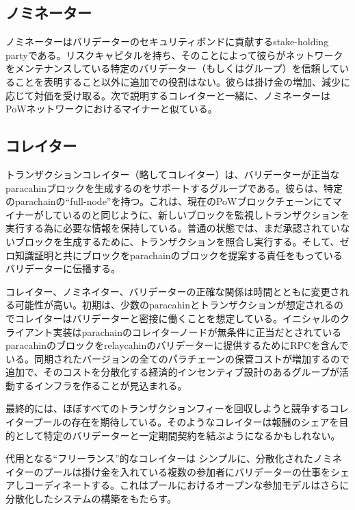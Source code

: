 \hypertarget{ux30ceux30dfux30cdux30fcux30bfux30fc}{%
\subsection{ノミネーター}\label{ux30ceux30dfux30cdux30fcux30bfux30fc}}

ノミネーターはバリデーターのセキュリティボンドに貢献するstake-holding
partyである。リスクキャピタルを持ち、そのことによって彼らがネットワークをメンテナンスしている特定のバリデーター（もしくはグループ）を信頼していることを表明すること以外に追加での役割はない。彼らは掛け金の増加、減少に応じて対価を受け取る。次で説明するコレイターと一緒に、ノミネーターはPoWネットワークにおけるマイナーと似ている。

\hypertarget{ux30b3ux30ecux30a4ux30bfux30fc}{%
\subsection{コレイター}\label{ux30b3ux30ecux30a4ux30bfux30fc}}

トランザクションコレイター（略してコレイター）は、バリデーターが正当なparacahinブロックを生成するのをサポートするグループである。彼らは、特定のparachainの``full-node''を持つ。これは、現在のPoWブロックチェーンにてマイナーがしているのと同じように、新しいブロックを監視しトランザクションを実行する為に必要な情報を保持している。普通の状態では、まだ承認されていないブロックを生成するために、トランザクションを照合し実行する。そして、ゼロ知識証明と共にブロックをparachainのブロックを提案する責任をもっているバリデーターに伝播する。

コレイター、ノミネイター、バリデーターの正確な関係は時間とともに変更される可能性が高い。初期は、少数のparacahinとトランザクションが想定されるのでコレイターはバリデーターと密接に働くことを想定している。イニシャルのクライアント実装はparachainのコレイターノードが無条件に正当だとされているparacahinのブロックをrelaycahinのバリデーターに提供するためにRPCを含んでいる。同期されたバージョンの全てのパラチェーンの保管コストが増加するので追加で、そのコストを分散化する経済的インセンティブ設計のあるグループが活動するインフラを作ることが見込まれる。

最終的には、ほぼすべてのトランザクションフィーを回収しようと競争するコレイタープールの存在を期待している。そのようなコレイターは報酬のシェアを目的として特定のバリデーターと一定期間契約を結ぶようになるかもしれない。

代用となる``フリーランス''的なコレイターは
シンプルに、分散化されたノミネイターのプールは掛け金を入れている複数の参加者にバリデーターの仕事をシェアしコーディネートする。これはプールにおけるオープンな参加モデルはさらに分散化したシステムの構築をもたらす。

